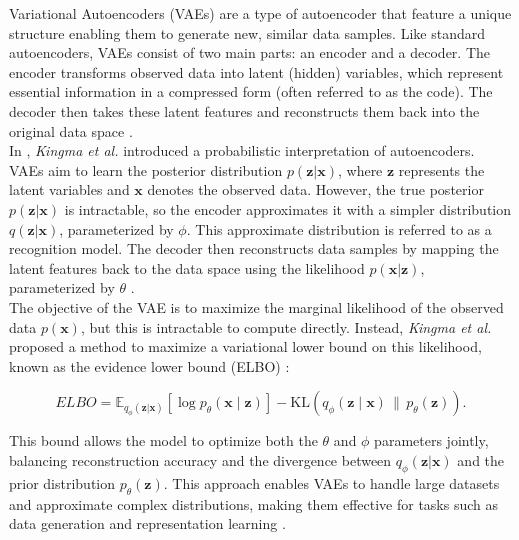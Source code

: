 Variational Autoencoders (VAEs) are a type of autoencoder that feature a unique structure enabling them to generate new, similar data samples. Like standard autoencoders, VAEs consist of two main parts: an encoder and a decoder. The encoder transforms observed data into latent (hidden) variables, which represent essential information in a compressed form (often referred to as the code). The decoder then takes these latent features and reconstructs them back into the original data space \cite{kingmaAutoEncodingVariationalBayes2013}.
\\
In \cite{kingmaAutoEncodingVariationalBayes2013}, \textit{Kingma et al.} introduced a probabilistic interpretation of autoencoders. VAEs aim to learn the posterior distribution \( p(\mathbf{z}|\mathbf{x}) \), where \( \mathbf{z} \) represents the latent variables and \( \mathbf{x} \) denotes the observed data. However, the true posterior \( p(\mathbf{z}|\mathbf{x}) \) is intractable, so the encoder approximates it with a simpler distribution \( q(\mathbf{z}|\mathbf{x}) \), parameterized by \( \phi \). This approximate distribution is referred to as a recognition model. The decoder then reconstructs data samples by mapping the latent features back to the data space using the likelihood \( p(\mathbf{x}|\mathbf{z}) \), parameterized by \( \theta \) \cite{kingmaAutoEncodingVariationalBayes2013}.
\\
The objective of the VAE is to maximize the marginal likelihood of the observed data \( p(\mathbf{x}) \), but this is intractable to compute directly. Instead, \textit{Kingma et al.} proposed a method to maximize a variational lower bound on this likelihood, known as the evidence lower bound (ELBO) \cite{kingmaIntroductionVariationalAutoencoders2019}:

\begin{equation}
ELBO = \mathbb{E}_{q_\phi(\mathbf{z|x})} \left[ \log p_\theta(\mathbf{x} \mid \mathbf{z}) \right] - \mathrm{KL} \left( q_\phi(\mathbf{z} \mid \mathbf{x}) \, \| \, p_\theta(\mathbf{z}) \right).
\end{equation}

\noindent This bound allows the model to optimize both the \( \theta \) and \( \phi \) parameters jointly, balancing reconstruction accuracy and the divergence between \( q_\phi(\mathbf{z}|\mathbf{x}) \) and the prior distribution \( p_\theta(\mathbf{z}) \). This approach enables VAEs to handle large datasets and approximate complex distributions, making them effective for tasks such as data generation and representation learning \cite{kingmaIntroductionVariationalAutoencoders2019}.

